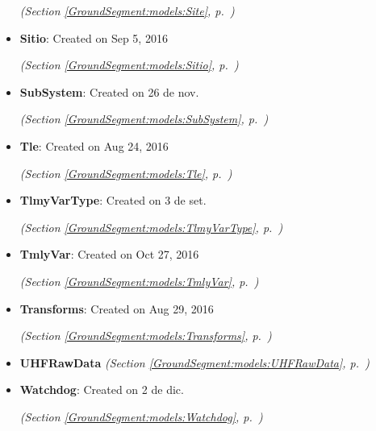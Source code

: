 \begin{itemize}
  \textit{(Section \ref{GroundSegment:models:Site}, p.~\pageref{GroundSegment:models:Site})}

\item \textbf{Sitio}: Created on Sep 5, 2016



  \textit{(Section \ref{GroundSegment:models:Sitio}, p.~\pageref{GroundSegment:models:Sitio})}

\item \textbf{SubSystem}: Created on 26 de nov.



  \textit{(Section \ref{GroundSegment:models:SubSystem}, p.~\pageref{GroundSegment:models:SubSystem})}

\item \textbf{Tle}: Created on Aug 24, 2016



  \textit{(Section \ref{GroundSegment:models:Tle}, p.~\pageref{GroundSegment:models:Tle})}

\item \textbf{TlmyVarType}: Created on 3 de set.



  \textit{(Section \ref{GroundSegment:models:TlmyVarType}, p.~\pageref{GroundSegment:models:TlmyVarType})}

\item \textbf{TmlyVar}: Created on Oct 27, 2016



  \textit{(Section \ref{GroundSegment:models:TmlyVar}, p.~\pageref{GroundSegment:models:TmlyVar})}

\item \textbf{Transforms}: Created on Aug 29, 2016



  \textit{(Section \ref{GroundSegment:models:Transforms}, p.~\pageref{GroundSegment:models:Transforms})}

\item \textbf{UHFRawData}
  \textit{(Section \ref{GroundSegment:models:UHFRawData}, p.~\pageref{GroundSegment:models:UHFRawData})}

\item \textbf{Watchdog}: Created on 2 de dic.



  \textit{(Section \ref{GroundSegment:models:Watchdog}, p.~\pageref{GroundSegment:models:Watchdog})}

\end{itemize}


